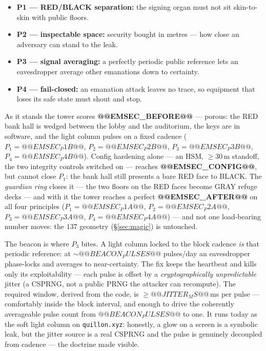 \documentclass[11pt,a4paper]{article}
\begin{document}
\begin{itemize}
\item \textbf{P1 --- RED/BLACK separation:} the signing organ must not sit
skin-to-skin with public floors.
\item \textbf{P2 --- inspectable space:} security bought in metres --- how close
an adversary can stand to the leak.
\item \textbf{P3 --- signal averaging:} a perfectly periodic public reference
lets an eavesdropper average other emanations down to certainty.
\item \textbf{P4 --- fail-closed:} an emanation attack leaves no trace, so
equipment that loses its safe state must shout and stop.
\end{itemize}

As it stands the tower scores \textbf{@@EMSEC_BEFORE@@} --- porous: the RED bank
hall is wedged between the lobby and the auditorium, the keys are in software,
and the light column pulses on a fixed cadence
($P_1 = @@EMSEC_P1B@@$, $P_2 = @@EMSEC_P2B@@$, $P_3 = @@EMSEC_P3B@@$,
$P_4 = @@EMSEC_P4B@@$). Config hardening alone --- an HSM, $\geq 30$\,m standoff,
the two integrity controls switched on --- reaches \textbf{@@EMSEC_CONFIG@@}, but
cannot close $P_1$: the bank hall still presents a bare RED face to BLACK. The
\emph{guardian ring} closes it --- the two floors on the RED faces become GRAY
refuge decks --- and with it the tower reaches a perfect \textbf{@@EMSEC_AFTER@@}
on all four principles ($P_1 = @@EMSEC_P1A@@$, $P_2 = @@EMSEC_P2A@@$,
$P_3 = @@EMSEC_P3A@@$, $P_4 = @@EMSEC_P4A@@$) --- and not one load-bearing number
moves: the $137$ geometry (\S\ref{sec:magic}) is untouched.

The beacon is where $P_3$ bites. A light column locked to the block cadence
\emph{is} that periodic reference: at $\sim@@BEACON_PULSES@@$ pulses/day an
eavesdropper phase-locks and averages to near-certainty. The fix keeps the
heartbeat and kills only its exploitability --- each pulse is offset by a
\emph{cryptographically unpredictable} jitter (a CSPRNG, not a public PRNG the
attacker can recompute). The required window, derived from the code, is
$\geq @@JITTER_MS@@$\,ms per pulse --- comfortably inside the block interval, and
enough to drive the coherently averageable pulse count from
$@@BEACON_PULSES@@$ to one. It runs today as the soft light column on
\texttt{quillon.xyz}: honestly, a glow on a screen is a symbolic leak, but the
jitter source is a real CSPRNG and the pulse is genuinely decoupled from cadence
--- the doctrine made visible.
\end{document}
